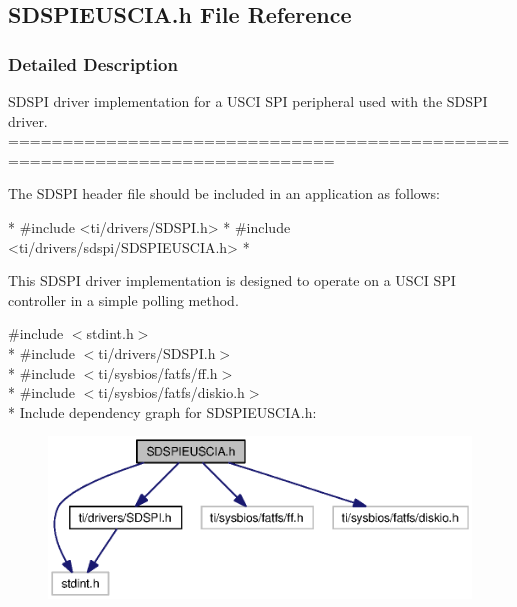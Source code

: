 \subsection{S\-D\-S\-P\-I\-E\-U\-S\-C\-I\-A.\-h File Reference}
\label{_s_d_s_p_i_e_u_s_c_i_a_8h}


\subsubsection{Detailed Description}
S\-D\-S\-P\-I driver implementation for a U\-S\-C\-I S\-P\-I peripheral used with the S\-D\-S\-P\-I driver. ============================================================================

The S\-D\-S\-P\-I header file should be included in an application as follows\-: 
\begin{DoxyCode}
*  #include <ti/drivers/SDSPI.h>
*  #include <ti/drivers/sdspi/SDSPIEUSCIA.h>
*  
\end{DoxyCode}


This S\-D\-S\-P\-I driver implementation is designed to operate on a U\-S\-C\-I S\-P\-I controller in a simple polling method. 

{\ttfamily \#include $<$stdint.\-h$>$}\\*
{\ttfamily \#include $<$ti/drivers/\-S\-D\-S\-P\-I.\-h$>$}\\*
{\ttfamily \#include $<$ti/sysbios/fatfs/ff.\-h$>$}\\*
{\ttfamily \#include $<$ti/sysbios/fatfs/diskio.\-h$>$}\\*
Include dependency graph for S\-D\-S\-P\-I\-E\-U\-S\-C\-I\-A.\-h\-:
\nopagebreak
\begin{figure}[H]
\begin{center}
\leavevmode
\includegraphics[width=350pt]{_s_d_s_p_i_e_u_s_c_i_a_8h__incl}
\end{center}
\end{figure}
